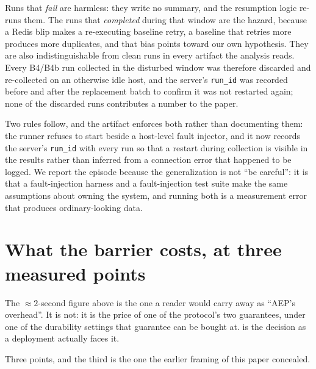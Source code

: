 \documentclass[10pt,journal,compsoc]{IEEEtran}
\begin{document}
Runs that \emph{fail} are harmless: they write no summary, and the resumption
logic re-runs them. The runs that \emph{completed} during that window are the
hazard, because a Redis blip makes a re-executing baseline retry, a baseline that
retries more produces more duplicates, and that bias points toward our own
hypothesis. They are also indistinguishable from clean runs in every artifact the
analysis reads. Every B4/B4b run collected in the disturbed window was therefore
discarded and re-collected on an otherwise idle host, and the server's
\texttt{run\_id} was recorded before and after the replacement batch to confirm
it was not restarted again; none of the discarded runs contributes a number to
the paper.

Two rules follow, and the artifact enforces both rather than documenting them:
the runner refuses to start beside a host-level fault injector, and it now
records the server's \texttt{run\_id} with every run so that a restart during
collection is visible in the results rather than inferred from a connection error
that happened to be logged. We report the episode because the generalization is
not ``be careful'': it is that a fault-injection harness and a fault-injection
test suite make the same assumptions about owning the system, and running both is
a measurement error that produces ordinary-looking data.


\section{What the barrier costs, at three measured points}
\label{supp:deployment}

The $\approx 2$-second figure above is the one a reader would carry away as
``AEP's overhead''. It is not: it is the price of one of the protocol's two
guarantees, under one of the durability settings that guarantee can be bought
at.  is the decision as a deployment actually faces it.



Three points, and the third is the one the earlier framing of this paper
concealed.
\end{document}
